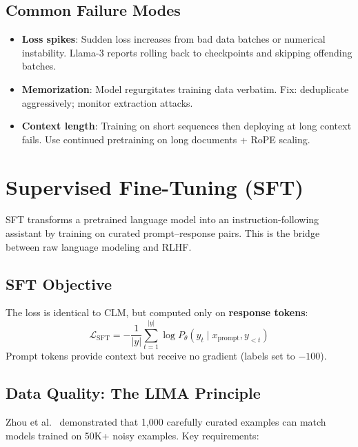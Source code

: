 \subsection{Common Failure Modes}
\label{common-failure-modes}

\begin{warningbox}
\begin{itemize}
  \item \textbf{Loss spikes}: Sudden loss increases from bad data batches or numerical instability. Llama-3 reports rolling back to checkpoints and skipping offending batches.
  \item \textbf{Memorization}: Model regurgitates training data verbatim. Fix: deduplicate aggressively; monitor extraction attacks.
  \item \textbf{Context length}: Training on short sequences then deploying at long context fails. Use continued pretraining on long documents + RoPE scaling.
\end{itemize}
\end{warningbox}

\section{Supervised Fine-Tuning (SFT)}
\label{sec:sft}

SFT transforms a pretrained language model into an instruction-following assistant by training on curated prompt--response pairs. This is the bridge between raw language modeling and RLHF.

\subsection{SFT Objective}
\label{sft-objective}

The loss is identical to CLM, but computed only on \textbf{response tokens}: 
\[
\mathcal{L}_\text{SFT} = -\frac{1}{|y|}\sum_{t=1}^{|y|} \log P_\theta(y_t \mid x_\text{prompt}, y_{<t})
\]
 Prompt tokens provide context but receive no gradient (labels set to $-100$).

\subsection{Data Quality: The LIMA Principle}
\label{data-quality-the-lima-principle}

Zhou et al.~\cite{zhou2023lima} demonstrated that 1,000 carefully curated examples can match models trained on 50K+ noisy examples. Key requirements:

